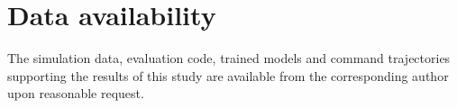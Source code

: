 \documentclass[11pt,a4paper]{article}
\begin{document}
\section*{Data availability}
The simulation data, evaluation code, trained models and command trajectories supporting the results of this study are available from the corresponding author upon reasonable request.
\end{document}
